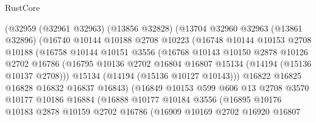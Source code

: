 \begin{lexlean}{RustCore}
\begin{coremodule}
                    (@32959
                      (@32961 @32963)
                      (@13856 @32828)
                      (@13704
                        @32960
                        @32963
                        (@13861 @32896)
                        (@16740
                          @10144
                          @10188
                          @2708
                          @10223
                          (@16748
                            @10144
                            @10153
                            @2708
                            @10188
                            (@16758
                              @10144
                              @10151
                              @3556
                              (@16768
                                @10143
                                @10150
                                @2878
                                @10126
                                @2702
                                @16786
                                (@16795
                                  @10136
                                  @2702
                                  @16804
                                  @16807
                                  @15134
                                  (@14194 (@15136 @10137 @2708)))
                                @15134
                                (@14194 (@15136 @10127 @10143)))
                              @16822
                              @16825
                              @16828
                              @16832
                              @16837
                              @16843)
                            (@16849
                              @10153
                              @599
                              @606
                              @13
                              @2708
                              @3570
                              @10177
                              @10186
                              @16884
                              (@16888
                                @10177
                                @10184
                                @3556
                                (@16895
                                  @10176
                                  @10183
                                  @2878
                                  @10159
                                  @2702
                                  @16786
                                  (@16909
                                    @10169
                                    @2702
                                    @16920
                                    @16807

\end{coremodule}
\end{lexlean}
